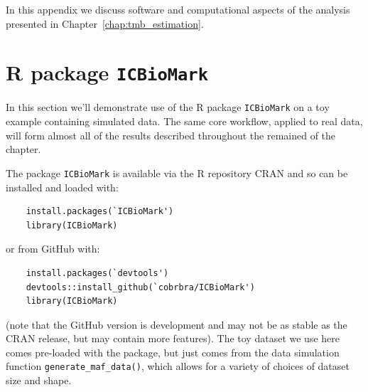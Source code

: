 \documentclass[../thesis.tex]{subfiles}
\begin{document}
In this appendix we discuss software and computational aspects of the analysis presented in Chapter~\ref{chap:tmb_estimation}.
\section{R package \texttt{ICBioMark}\label{sec:icbiomark}}
In this section we'll demonstrate use of the R package \texttt{ICBioMark} \citep{bradley_icbiomark_2021} on a toy example containing simulated data. The same core workflow, applied to real data, will form almost all of the results described throughout the remained of the chapter.

The package \texttt{ICBioMark} is available via the R repository CRAN and so can be installed and loaded with:
\begin{lstlisting}
    install.packages(`ICBioMark')
    library(ICBioMark)
\end{lstlisting}
or from GitHub with:
\begin{lstlisting}
    install.packages(`devtools') 
    devtools::install_github(`cobrbra/ICBioMark')
    library(ICBioMark)
\end{lstlisting}
(note that the GitHub version is development and may not be as stable as the CRAN release, but may contain more features). The toy dataset we use here comes pre-loaded with the package, but just comes from the data simulation function \lstinline{generate_maf_data()}, which allows for a variety of choices of dataset size and shape.
\end{document}
